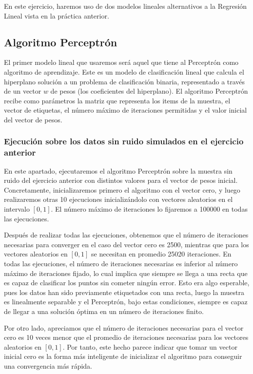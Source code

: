 \documentclass[10pt,a4paper]{article}
\begin{document}
En este ejercicio, haremos uso de dos modelos lineales alternativos a la Regresión Lineal vista en la práctica anterior.

\subsection{Algoritmo Perceptrón}

El primer modelo lineal que usaremos será aquel que tiene al Perceptrón como algoritmo de aprendizaje. Este es un modelo de clasificación lineal que calcula el hiperplano solución a un problema de clasificación binaria, representado a través de un vector $w$ de pesos (los coeficientes del hiperplano). El algoritmo Perceptrón recibe como parámetros la matriz que representa los items de la muestra, el vector de etiquetas, el número máximo de iteraciones permitidas y el valor inicial del vector de pesos.

\subsubsection{Ejecución sobre los datos sin ruido simulados en el ejercicio anterior}

En este apartado, ejecutaremos el algoritmo Perceptrón sobre la muestra sin ruido del ejercicio anterior con distintos valores para el vector de pesos inicial. Concretamente, inicializaremos primero el algoritmo con el vector cero, y luego realizaremos otras 10 ejecuciones inicializándolo con vectores aleatorios en el intervalo $[0,1]$. El número máximo de iteraciones lo fijaremos a 100000 en todas las ejecuciones. 

Después de realizar todas las ejecuciones, obtenemos que el número de iteraciones necesarias para converger en el caso del vector cero es 2500, mientras que para los vectores aleatorios en $[0,1]$ se necesitan en promedio 25020 iteraciones. En todas las ejecuciones, el número de iteraciones necesarias es inferior al número máximo de iteraciones fijado, lo cual implica que siempre se llega a una recta que es capaz de clasificar los puntos sin cometer ningún error. Esto era algo esperable, pues los datos han sido previamente etiquetados con una recta, luego la muestra es linealmente separable y el Perceptrón, bajo estas condiciones, siempre es capaz de llegar a una solución óptima en un número de iteraciones finito.

Por otro lado, apreciamos que el número de iteraciones necesarias para el vector cero es 10 veces menor que el promedio de iteraciones necesarias para los vectores aleatorios en $[0,1]$. Por tanto, este hecho parece indicar que tomar un vector inicial cero es la forma más inteligente de inicializar el algoritmo para conseguir una convergencia más rápida.
\end{document}
